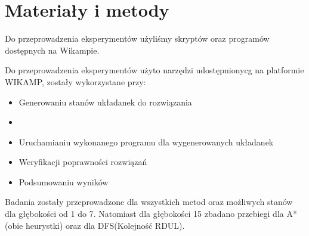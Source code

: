 \documentclass{classrep}
\begin{document}
    \section{Materiały i metody}
    {\color{blue}
        Do przeprowadzenia eksperymentów użyliśmy skryptów oraz programów dostępnych na Wikampie.

    Do przeprowadzenia eksperymentów użyto narzędzi udostępnionycg na platformie WIKAMP,
    zostały wykorzystane przy:
       \begin{itemize}
            \item Generowaniu stanów układanek do rozwiązania
            \item \item Uruchamianiu wykonanego programu dla wygenerowanych układanek
          \item Weryfikacji poprawności rozwiązań
           \item Podsumowaniu wyników
     \end{itemize}
    Badania zostały przeprowadzone dla wszystkich metod oraz możliwych stanów dla
    głębokości od 1 do 7. Natomiast dla głębokości 15 zbadano przebiegi dla A*(obie heurystki)
    oraz dla DFS(Kolejność RDUL).
    }
\end{document}
